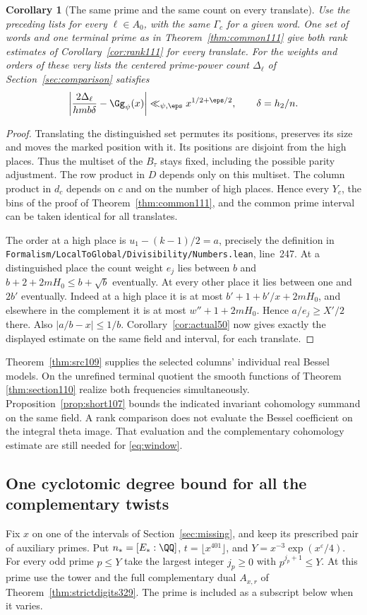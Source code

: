 \documentclass[a4paper,11pt]{article}
\newtheorem{corollary}[proposition]{Corollary}
\theoremstyle{definition}
\theoremstyle{remark}
\newcommand{\srcloc}[2]{{\small\nolinkurl{#1.lean}}, line~#2}
\numberwithin{equation}{section}
\begin{document}
\begin{corollary}[The same prime and the same count on every translate]
\label{cor:count111}
Use the preceding lists for every \(\ell\in A_0\), with the same
\(\Gamma_c\) for a given word. One set of words and one terminal
prime as in Theorem~\ref{thm:common111} give both rank estimates of
Corollary~\ref{cor:rank111} for every translate. For the weights
and orders of these very lists the centered prime-power count
\(\Delta_\ell\) of Section~\ref{sec:comparison} satisfies
\[
 \left|\frac{2\Delta_\ell}{hm b\delta}-\Gg_\psi(x)\right|
       \ll_{\psi,\eps}x^{1/2+\eps/2},\qquad \delta=h_2/n .
\]
\end{corollary}
\begin{proof}
Translating the distinguished set permutes its positions, preserves
its size and moves the marked position with it. Its positions
are disjoint from the high places. Thus the multiset of the
\(B_\tau\) stays fixed, including the possible parity adjustment.
The row product in \(D\) depends only on this multiset. The
column product in \(d_c\) depends on \(c\) and on the number
of high places. Hence every \(Y_c\), the bins of the proof of
Theorem~\ref{thm:common111}, and the common prime interval can
be taken identical for all translates.

The order at a high place is \(u_1-(k-1)/2=a\), precisely the
definition in \srcloc{Formalism/LocalToGlobal/Divisibility/Numbers}{247}.
At a distinguished place the count weight \(e_j\) lies between
\(b\) and \(b+2+2mH_0\le b+\sqrt b\) eventually. At every other
place it lies between one and \(2b'\) eventually. Indeed at a
high place it is at most \(b'+1+b'/x+2mH_0\), and elsewhere in
the complement it is at most \(w''+1+2mH_0\). Hence \(a/e_j\ge
X'/2\) there. Also \(|a/b-x|\le1/b\). Corollary~\ref{cor:actual50}
now gives exactly the displayed estimate on the same field and
interval, for each translate.
\end{proof}

Theorem~\ref{thm:src109} supplies the selected columns' individual
real Bessel models. On the unrefined terminal quotient the
smooth functions of Theorem \ref{thm:section110} realize both frequencies simultaneously.
Proposition~\ref{prop:short107} bounds the indicated invariant
cohomology summand on the same field. A rank comparison does
not evaluate the Bessel coefficient on the integral theta image.
That evaluation and the complementary cohomology estimate are
still needed for \eqref{eq:window}.

\subsection{One cyclotomic degree bound for all the complementary twists}\label{nav:degreebudget329}
Fix \(x\) on one of the intervals of Section~\ref{sec:missing}, and
keep its prescribed pair of auxiliary primes. Put \(n_*=[E_*:\QQ]\),
\(t=\lfloor x^{401}\rfloor\), and \(Y=x^{-3}\exp(x^\varepsilon/4)\).
For every odd prime \(p\le Y\) take the largest integer \(j_p\ge0\)
with \(p^{j_p+1}\le Y\). At this prime use the tower and the full
complementary dual \(A_{x,r}\) of Theorem~\ref{thm:strictdigits329}.
The prime is included as a subscript below when it varies.
\end{document}
